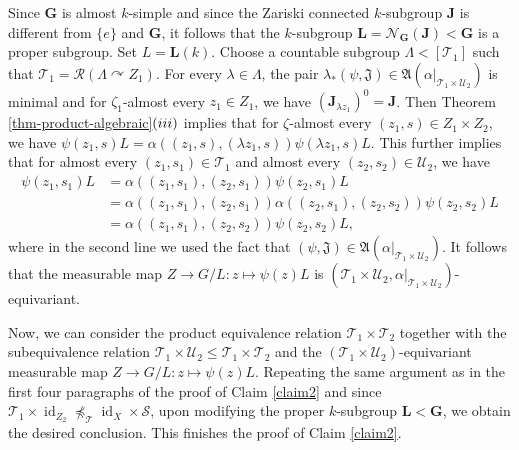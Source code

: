 \documentclass[11pt]{amsart}
\numberwithin{equation}{section}
\theoremstyle{plain}
\theoremstyle{definition}
\newcommand{\id}{\operatorname{id}}
\begin{document}
Since $\mathbf G$ is almost $k$-simple and since the Zariski connected $k$-subgroup $\mathbf J$ is different from $\{e\}$ and $\mathbf G$, it follows that the $k$-subgroup $\mathbf L = \mathscr N_{\mathbf G}(\mathbf J) < \mathbf G$ is a proper subgroup. Set $L = \mathbf L(k)$. Choose a countable subgroup $\Lambda < [\mathscr T_1]$ such that $\mathscr T_1 = \mathscr R(\Lambda \curvearrowright Z_1)$. For every $\lambda \in \Lambda$, the pair $\lambda_\ast(\psi, \mathfrak J) \in \mathfrak A(\alpha|_{\mathscr T_1 \times \mathscr U_2})$ is minimal and for $\zeta_1$-almost every $z_1 \in Z_1$, we have $(\mathbf J_{\lambda z_1})^0 = \mathbf J$. Then Theorem \ref{thm-product-algebraic}$(\rm iii)$ implies that for $\zeta$-almost every $(z_1, s) \in Z_1 \times Z_2$, we have
$\psi(z_1, s) L = \alpha((z_1, s), (\lambda z_1, s))\psi(\lambda z_1, s) L$. This further implies that for almost every $(z_1, s_1) \in \mathscr T_1$ and almost every $(z_2, s_2) \in \mathscr U_2$, we have
\begin{align*}
\psi(z_1, s_1) L &= \alpha((z_1, s_1), (z_2, s_1))\psi(z_2, s_1) L \\
&=  \alpha((z_1, s_1), (z_2, s_1)) \alpha((z_2, s_1), (z_2, s_2)) \psi(z_2, s_2) L  \\
&=  \alpha((z_1, s_1), (z_2, s_2))\psi(z_2, s_2) L,
\end{align*}
where in the second line we used the fact that $(\psi, \mathfrak J) \in \mathfrak A(\alpha|_{\mathscr T_1 \times \mathscr U_2})$. It follows that the measurable map $Z \to G/L : z \mapsto \psi(z)L$ is $(\mathscr T_1 \times \mathscr U_2, \alpha|_{\mathscr T_1 \times \mathscr U_2})$-equivariant.

Now, we can consider the product equivalence relation $\mathscr T_1 \times \mathscr T_2$ together with the subequivalence relation $\mathscr T_1 \times \mathscr U_2 \leq \mathscr T_1 \times \mathscr T_2$ and the $(\mathscr T_1 \times \mathscr U_2)$-equivariant measurable map $Z \to G/L : z \mapsto \psi(z)L$. Repeating the same argument as in the first four paragraphs of the proof of Claim \ref{claim2} and since $\mathscr T_1 \times \id_{Z_2} \npreceq_{\mathscr T} \id_X \times \mathscr S$, upon modifying the proper $k$-subgroup $\mathbf L < \mathbf G$, we obtain the desired conclusion. This finishes the proof of Claim \ref{claim2}.
\end{document}
